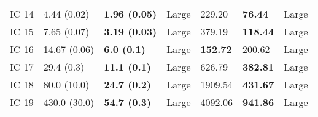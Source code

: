 \begin{tabular}{lllllll}
IC 14 &       4.44 (0.02) &   \textbf{1.96 (0.05)} &       Large &                  229.20 &           \textbf{76.44} &       Large \\
IC 15 &       7.65 (0.07) &   \textbf{3.19 (0.03)} &       Large &                  379.19 &          \textbf{118.44} &       Large \\
IC 16 &      14.67 (0.06) &     \textbf{6.0 (0.1)} &       Large &         \textbf{152.72} &                   200.62 &       Large \\
IC 17 &        29.4 (0.3) &    \textbf{11.1 (0.1)} &       Large &                  626.79 &          \textbf{382.81} &       Large \\
IC 18 &       80.0 (10.0) &    \textbf{24.7 (0.2)} &       Large &                 1909.54 &          \textbf{431.67} &       Large \\
IC 19 &      430.0 (30.0) &    \textbf{54.7 (0.3)} &       Large &                 4092.06 &          \textbf{941.86} &       Large \\
\bottomrule
\end{tabular}
